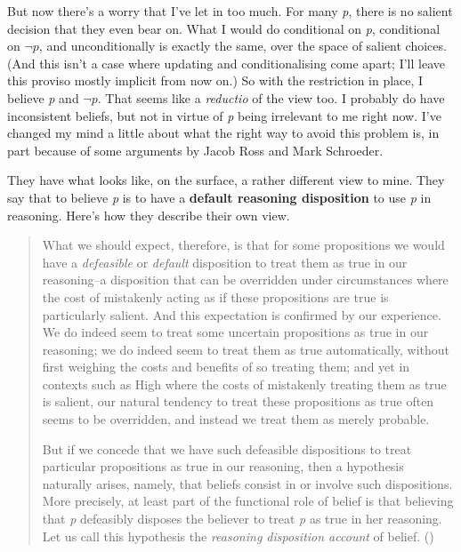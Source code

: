 \documentclass[
  10pt,
  letterpaper,
  DIV=11,
  numbers=noendperiod,
  twoside]{scrartcl}
\begin{document}
But now there's a worry that I've let in too much. For many \emph{p},
there is no salient decision that they even bear on. What I would do
conditional on \emph{p}, conditional on \(\neg p\), and unconditionally
is exactly the same, over the space of salient choices. (And this isn't
a case where updating and conditionalising come apart; I'll leave this
proviso mostly implicit from now on.) So with the restriction in place,
I believe \emph{p} and \(\neg p\). That seems like a \emph{reductio} of
the view too. I probably do have inconsistent beliefs, but not in virtue
of \emph{p} being irrelevant to me right now. I've changed my mind a
little about what the right way to avoid this problem is, in part
because of some arguments by Jacob Ross and Mark Schroeder.

They have what looks like, on the surface, a rather different view to
mine. They say that to believe \emph{p} is to have a \textbf{default
reasoning disposition} to use \emph{p} in reasoning. Here's how they
describe their own view.

\begin{quote}
What we should expect, therefore, is that for some propositions we would
have a \emph{defeasible} or \emph{default} disposition to treat them as
true in our reasoning--a disposition that can be overridden under
circumstances where the cost of mistakenly acting as if these
propositions are true is particularly salient. And this expectation is
confirmed by our experience. We do indeed seem to treat some uncertain
propositions as true in our reasoning; we do indeed seem to treat them
as true automatically, without first weighing the costs and benefits of
so treating them; and yet in contexts such as High where the costs of
mistakenly treating them as true is salient, our natural tendency to
treat these propositions as true often seems to be overridden, and
instead we treat them as merely probable.

But if we concede that we have such defeasible dispositions to treat
particular propositions as true in our reasoning, then a hypothesis
naturally arises, namely, that beliefs consist in or involve such
dispositions. More precisely, at least part of the functional role of
belief is that believing that \emph{p} defeasibly disposes the believer
to treat \emph{p} as true in her reasoning. Let us call this hypothesis
the \emph{reasoning disposition account} of belief.
()
\end{quote}
\end{document}
